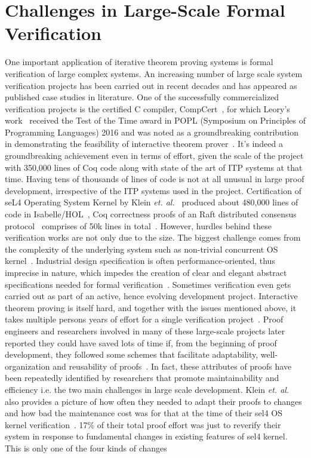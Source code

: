 \section{Challenges in Large-Scale Formal Verification}
\label{sec:ITPinLarge}

One important application of iterative theorem proving systems is formal verification of large complex systems. An increasing number of large scale system verification projects has been carried out in recent decades and has appeared as published case studies in literature. One of the successfully commercialized verification projects is the certified C compiler, CompCert~\cite{Leroy_2006, Leroy_2009}, for which Leory's work~\cite{Leroy_2006} received the Test of the Time award in POPL (Symposium on Principles of Programming Languages) 2016 and was noted as a groundbreaking contribution in demonstrating the feasibility of interactive theorem prover~\cite{ACM_SIGPLAN_2016}. It's indeed a groundbreaking achievement even in terms of effort, given the scale of the project with 350,000 lines of Coq code along with state of the art of ITP systems at that time. Having tens of thousands of lines of code is not at all unusual in large proof development, irrespective of the ITP systems used in the project. Certification of seL4 Operating System Kernel by Klein \emph{et. al.}~\cite{Klein_et_al_2009} produced about 480,000 lines of code in Isabelle/HOL~\cite{Klein_et_al_2014}, Coq correctness proofs of an Raft distributed consensus protocol~\cite{Ongaro_et_al_2014} comprises of 50k lines in total~\cite{Woos_et_al_2016}. However, hurdles behind these verification works are not only due to the size. The biggest challenge comes from the complexity of the underlying system such as non-trivial concurrent OS kernel~\cite{Gu_et_al_2016}. Industrial design specification is often performance-oriented, thus imprecise in nature, which impedes the creation of clear and elegant abstract specifications needed for formal verification~\cite{Kaivola_et_al_2003}. Sometimes verification even gets carried out as part of an active, hence evolving development project. Interactive theorem proving is itself hard, and together with the issues mentioned above, it takes multiple persons years of effort for a single verification project~\cite{Delaware_et_al_2011}. Proof engineers and researchers involved in many of these large-scale projects later reported they could have saved lots of time if, from the beginning of proof development, they followed some schemes that facilitate adaptability, well-organization and reusability of proofs~\cite{Curzon_1995, Kaivola_et_al_2003, Woos_et_al_2016}. In fact, these attributes of proofs have been repeatedly identified by researchers that promote maintainability and efficiency i.e. the two main challenges in large scale development. Klein \emph{et. al.}~\cite{Klein_et_al_2014} also provides a picture of how often they needed to adapt their proofs to changes and how bad the maintenance cost was for that at the time of their sel4 OS kernel verification~\cite{Klein_et_al_2009}. 17\% of their total proof effort was just to reverify their system in response to fundamental changes in existing features of sel4 kernel. This is only one of the four kinds of changes 